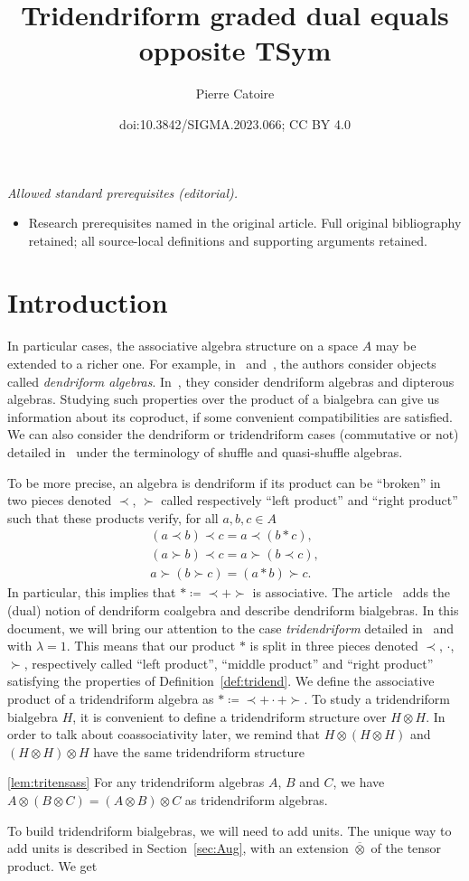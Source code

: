 \documentclass[10pt,a4paper]{amsart}
\title{Tridendriform graded dual equals opposite TSym}
\author{Pierre Catoire}
\date{doi:10.3842/SIGMA.2023.066; CC BY 4.0}
\numberwithin{equation}{section}
\theoremstyle{definition}
\theoremstyle{plain}
\begin{document}
\maketitle
\noindent\textit{Allowed standard prerequisites (editorial).}\begin{itemize}
\item Research prerequisites named in the original article. Full original bibliography retained; all source-local definitions and supporting arguments retained.
\end{itemize}\medskip
\section{Introduction}
In particular cases, the associative algebra structure on a space $A$ may be extended to a richer one. For example, in~\cite{bidend} and~\cite{euleridem}, the authors consider objects called \emph{dendriform algebras}. In~\cite{Scind}, they consider dendriform algebras and dipterous algebras. Studying such properties over the product of a bialgebra can give us information about its coproduct, if some convenient compatibilities are satisfied. We can also consider the dendriform or tridendriform cases (commutative or not) detailed in~\cite{Quasi-shuffle} under the terminology of shuffle and quasi-shuffle algebras.

 To be more precise, an algebra is dendriform if its product can be ``broken'' in two pieces denoted $\prec$, $\succ$ called respectively ``left product'' and ``right product'' such that these products verify, for all $a,b,c\in A$
\begin{gather*}
	(a\prec b)\prec c= a\prec (b*c), \\
	(a\succ b)\prec c= a\succ (b\prec c), \\
	a\succ (b\succ c)= (a*b)\succ c.
\end{gather*}
In particular, this implies that $*\coloneqq\prec+\succ$ is associative. The article~\cite{bidend} adds the (dual) notion of dendriform coalgebra and describe dendriform bialgebras.
In this document, we will bring our attention to the case \emph{tridendriform} detailed in~\cite{Trial} and~\cite{Tridend} with $\lambda=1$. This means that our product $*$ is split in three pieces denoted $\prec$, $\cdot$, $\succ$, respectively called ``left product'', ``middle product'' and ``right product'' satisfying the properties of Definition~\ref{def:tridend}.
We define the associative product of a tridendriform algebra as $*\coloneqq\prec+\cdot+\succ$. To study a tridendriform bialgebra $H$, it is convenient to define a tridendriform structure over $H\otimes H$.
 In order to talk about coassociativity later, we remind that $H\otimes(H\otimes H)$ and $(H\otimes H)\otimes H$ have the same tridendriform structure
\begin{customlemma}{\ref{lem:tritensass}}
	For any tridendriform algebras $A$, $B$ and $C$, we have $A\otimes(B\otimes C)=(A\otimes B)\otimes C$ as tridendriform algebras.
\end{customlemma}
To build tridendriform bialgebras, we will need to add units. The unique way to add units is described in Section~\ref{sec:Aug}, with an extension $\overline{\otimes}$ of the tensor product. We get
\end{document}
